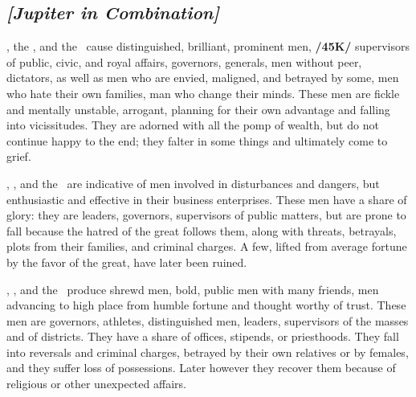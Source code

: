 \subsection{\textit{[Jupiter in Combination]}}
\Jupiter, the \Sun, and the \Moon\, cause distinguished, brilliant, prominent men, \textbf{/45K/} supervisors of public, civic, and royal affairs, governors, generals, men without peer, dictators, as well as men who are envied, maligned, and betrayed by some, men who hate their own families, man who change their minds. These men are fickle and mentally unstable, arrogant, planning for their own advantage and falling into vicissitudes. They are adorned with all the pomp of wealth, but do not continue happy to the end; they falter in some things and ultimately come to grief.

\Jupiter, \Mars, and the \Sun\, are indicative of men involved in disturbances and dangers, but enthusiastic and effective in their business enterprises. These men have a share of glory: they are leaders, governors, supervisors of public matters, but are prone to fall because the hatred of the great follows them, along with threats, betrayals, plots from their families, and criminal charges. A few, lifted from average fortune by the favor of the great, have later been ruined.

\Jupiter, \Mars, and the \Moon\, produce shrewd men, bold, public men with many friends, men advancing to high place from humble fortune and thought worthy of trust. These men are governors, athletes, distinguished men, leaders, supervisors of the masses and of districts. They have a share of offices, stipends, or priesthoods. They fall into reversals and criminal charges, betrayed by their own relatives or by females, and they suffer loss of possessions. Later however they recover them because of religious or other unexpected affairs.

